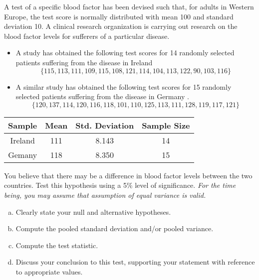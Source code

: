 
\item 
A test of a specific blood factor has been devised such that, for adults in Western Europe, the test score is normally distributed with mean 100 and standard deviation 10. A clinical research organization is carrying out research on the blood factor levels for sufferers of a particular disease.  

\begin{itemize}
	\item A study has obtained the following test scores for 14 randomly selected patients suffering from the disease in Ireland 
	\[ \{115, 113, 111, 109, 115, 108, 121, 114, 104, 113, 122, 90, 
	103, 116\}\]
	
	\item A similar study has obtained the following test scores for 15 randomly selected patients suffering from the disease in Germany .
	\[\{120, 137, 114, 120, 116, 118, 101, 110, 125, 113, 111, 128, 
	119, 117, 121\}\]
	
	\end{itemize}
	
		\begin{center}	
	\begin{tabular}{|c|c|c|c|} \hline 
		Sample & Mean & Std. Deviation & Sample Size \\  \hline 
		Ireland & 111 & 8.143 & 14 \\ \hline 
		Gemany & 118 & 8.350 & 15 \\ \hline
		\end{tabular} 
				\end{center}
You believe that there may be a difference in blood factor levels between the two countries. Test this hypothesis using a 5\% level of significance. \textit{For the time being, you may assume that assumption of equal variance is valid. }
\begin{enumerate}[(a)]
	\item Clearly state your null and alternative hypotheses.

	\item Compute the pooled standard deviation and/or pooled variance.
	\item Compute the test statistic.
	\item Discuss your conclusion to this test, supporting your statement with reference to appropriate values.
\end{enumerate}	


